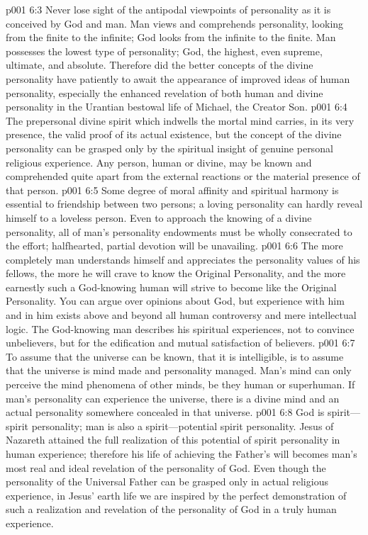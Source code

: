 \vs p001 6:3 Never lose sight of the antipodal viewpoints of personality as it is conceived by God and man. Man views and comprehends personality, looking from the finite to the infinite; God looks from the infinite to the finite. Man possesses the lowest type of personality; God, the highest, even supreme, ultimate, and absolute. Therefore did the better concepts of the divine personality have patiently to await the appearance of improved ideas of human personality, especially the enhanced revelation of both human and divine personality in the Urantian bestowal life of Michael, the Creator Son.
\pc \vs p001 6:4 The prepersonal divine spirit which indwells the mortal mind carries, in its very presence, the valid proof of its actual existence, but the concept of the divine personality can be grasped only by the spiritual insight of genuine personal religious experience. Any person, human or divine, may be known and comprehended quite apart from the external reactions or the material presence of that person.
\vs p001 6:5 Some degree of moral affinity and spiritual harmony is essential to friendship between two persons; a loving personality can hardly reveal himself to a loveless person. Even to approach the knowing of a divine personality, all of man’s personality endowments must be wholly consecrated to the effort; halfhearted, partial devotion will be unavailing.
\vs p001 6:6 The more completely man understands himself and appreciates the personality values of his fellows, the more he will crave to know the Original Personality, and the more earnestly such a God\hyp{}knowing human will strive to become like the Original Personality. You can argue over opinions about God, but experience with him and in him exists above and beyond all human controversy and mere intellectual logic. The God\hyp{}knowing man describes his spiritual experiences, not to convince unbelievers, but for the edification and mutual satisfaction of believers.
\pc \vs p001 6:7 To assume that the universe can be known, that it is intelligible, is to assume that the universe is mind made and personality managed. Man’s mind can only perceive the mind phenomena of other minds, be they human or superhuman. If man’s personality can experience the universe, there is a divine mind and an actual personality somewhere concealed in that universe.\plusone
\pc \vs p001 6:8 God is spirit---spirit personality; man is also a spirit---potential spirit personality. Jesus of Nazareth attained the full realization of this potential of spirit personality in human experience; therefore his life of achieving the Father’s will becomes man’s most real and ideal revelation of the personality of God. Even though the personality of the Universal Father can be grasped only in actual religious experience, in Jesus’ earth life we are inspired by the perfect demonstration of such a realization and revelation of the personality of God in a truly human experience.
